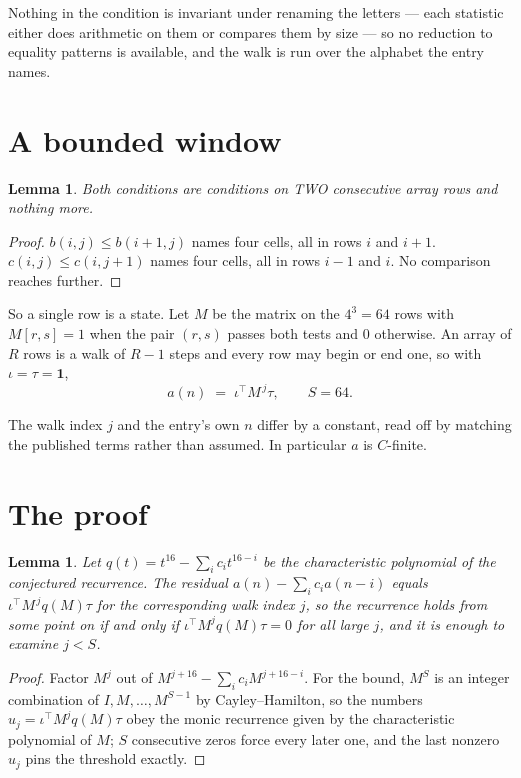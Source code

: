 \documentclass[11pt,a4paper]{article}
\theoremstyle{plain}
\newtheorem{lemma}[theorem]{Lemma}
\theoremstyle{definition}
\begin{document}
Nothing in the condition is invariant under renaming the letters --- each statistic either does
arithmetic on them or compares them by size --- so no reduction to equality patterns is
available, and the walk is run over the alphabet the entry names.

\section{A bounded window}

\begin{lemma}\label{lem:win}
Both conditions are conditions on TWO consecutive array rows and nothing more.
\end{lemma}

\begin{proof}
$b(i,j)\le b(i{+}1,j)$ names four cells, all in rows $i$ and $i+1$. $c(i,j)\le c(i,j{+}1)$
names four cells, all in rows $i-1$ and $i$. No comparison reaches further.
\end{proof}

So a single row is a state. Let $M$ be the matrix on the $4^{3}=64$ rows with
$M[r,s]=1$ when the pair $(r,s)$ passes both tests and $0$ otherwise. An array of $R$ rows is a
walk of $R-1$ steps and every row may begin or end one, so with $\iota=\tau=\mathbf{1}$,
\[
a(n)\;=\;\iota^{\!\top}M^{\,j}\tau ,\qquad S=64.
\]

The walk index $j$ and the entry's own $n$ differ by a constant, read off by matching the
published terms rather than assumed. In particular $a$ is $C$-finite.

\section{The proof}

\begin{lemma}\label{lem:crit}
Let $q(t)=t^{16}-\sum_i c_it^{16-i}$ be the characteristic polynomial of the
conjectured recurrence. The residual $a(n)-\sum_ic_ia(n-i)$ equals
$\iota^{\!\top}M^{\,j}q(M)\tau$ for the corresponding walk index $j$, so the recurrence
holds from some point on if and only if $\iota^{\!\top}M^{j}q(M)\tau=0$ for all large $j$,
and it is enough to examine $j<S$.
\end{lemma}

\begin{proof}
Factor $M^{j}$ out of $M^{j+16}-\sum_ic_iM^{j+16-i}$. For the bound, $M^{S}$
is an integer combination of $I,M,\dots,M^{S-1}$ by Cayley--Hamilton, so the numbers
$u_j=\iota^{\!\top}M^{j}q(M)\tau$ obey the monic recurrence given by the characteristic
polynomial of $M$; $S$ consecutive zeros force every later one, and the last nonzero $u_j$
pins the threshold exactly.
\end{proof}
\end{document}
